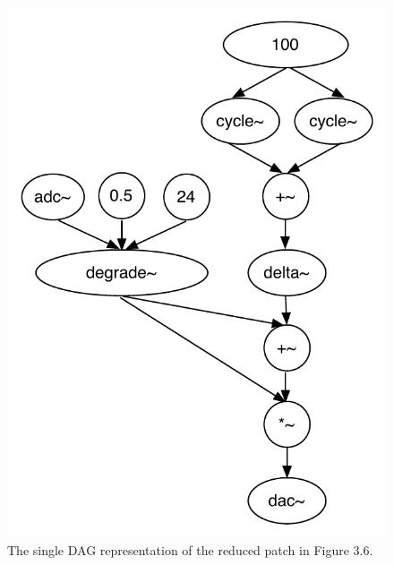 \documentclass[12pt]{report} 	%
\numberwithin{figure}{chapter}
\numberwithin{table}{chapter}
\numberwithin{equation}{chapter}
\begin{document}
\begin{flushleft}
\begin{figure}[h!]
\begin{center}
\end{center}
\end{figure}
\begin{figure}[h!]
\begin{center}
\includegraphics[scale=0.8]{MaxDAGsSendReceive2}
\caption[Reducing a set of DAGs to a single DAG]{The single DAG representation of the reduced patch in Figure 3.6.}
\end{center}
\end{figure}


\end{flushleft}
\end{document}
